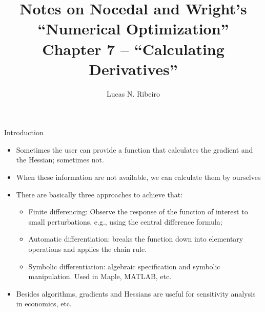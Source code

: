 \documentclass{beamer}
\title[Chapter 7]{Notes on Nocedal and Wright's ``Numerical Optimization''\\Chapter 7 --  ``Calculating Derivatives''}
\author{Lucas N. Ribeiro}
\date{}
\begin{document}
 
\frame{\titlepage}
 
\begin{frame}[allowframebreaks]{Introduction}
	\begin{itemize}
		\item Sometimes the user can provide a function that calculates the gradient and the Hessian; sometimes not.
		\item When these information are not available, we can calculate them by ourselves
		\item There are basically three approaches to achieve that:
		\begin{itemize}
			\item Finite differencing: Observe the response of the function of interest to small perturbations, e.g., using the central difference formula;
			\item Automatic differentiation: breaks the function down into elementary operations and applies the chain rule.
			\item Symbolic differentiation: algebraic specification and symbolic manipulation. Used in Maple, MATLAB, etc.
		\end{itemize} 
		\item Besides algorithms, gradients and Hessians are useful for sensitivity analysis in economics, etc.
	\end{itemize}
\end{frame}
\end{document}
